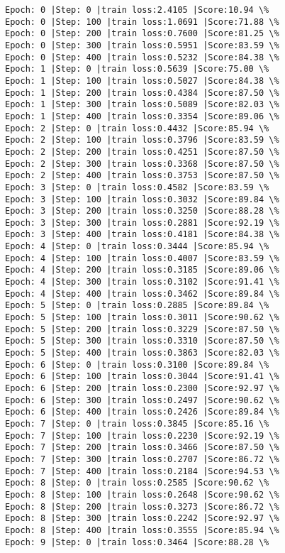 \documentclass[11pt]{article}
\begin{document}
    \begin{Verbatim}[commandchars=\\\{\}]
Epoch: 0 |Step: 0 |train loss:2.4105 |Score:10.94 \%
Epoch: 0 |Step: 100 |train loss:1.0691 |Score:71.88 \%
Epoch: 0 |Step: 200 |train loss:0.7600 |Score:81.25 \%
Epoch: 0 |Step: 300 |train loss:0.5951 |Score:83.59 \%
Epoch: 0 |Step: 400 |train loss:0.5232 |Score:84.38 \%
Epoch: 1 |Step: 0 |train loss:0.5639 |Score:75.00 \%
Epoch: 1 |Step: 100 |train loss:0.5027 |Score:84.38 \%
Epoch: 1 |Step: 200 |train loss:0.4384 |Score:87.50 \%
Epoch: 1 |Step: 300 |train loss:0.5089 |Score:82.03 \%
Epoch: 1 |Step: 400 |train loss:0.3354 |Score:89.06 \%
Epoch: 2 |Step: 0 |train loss:0.4432 |Score:85.94 \%
Epoch: 2 |Step: 100 |train loss:0.3796 |Score:83.59 \%
Epoch: 2 |Step: 200 |train loss:0.4251 |Score:87.50 \%
Epoch: 2 |Step: 300 |train loss:0.3368 |Score:87.50 \%
Epoch: 2 |Step: 400 |train loss:0.3753 |Score:87.50 \%
Epoch: 3 |Step: 0 |train loss:0.4582 |Score:83.59 \%
Epoch: 3 |Step: 100 |train loss:0.3032 |Score:89.84 \%
Epoch: 3 |Step: 200 |train loss:0.3250 |Score:88.28 \%
Epoch: 3 |Step: 300 |train loss:0.2881 |Score:92.19 \%
Epoch: 3 |Step: 400 |train loss:0.4181 |Score:84.38 \%
Epoch: 4 |Step: 0 |train loss:0.3444 |Score:85.94 \%
Epoch: 4 |Step: 100 |train loss:0.4007 |Score:83.59 \%
Epoch: 4 |Step: 200 |train loss:0.3185 |Score:89.06 \%
Epoch: 4 |Step: 300 |train loss:0.3102 |Score:91.41 \%
Epoch: 4 |Step: 400 |train loss:0.3462 |Score:89.84 \%
Epoch: 5 |Step: 0 |train loss:0.2885 |Score:89.84 \%
Epoch: 5 |Step: 100 |train loss:0.3011 |Score:90.62 \%
Epoch: 5 |Step: 200 |train loss:0.3229 |Score:87.50 \%
Epoch: 5 |Step: 300 |train loss:0.3310 |Score:87.50 \%
Epoch: 5 |Step: 400 |train loss:0.3863 |Score:82.03 \%
Epoch: 6 |Step: 0 |train loss:0.3100 |Score:89.84 \%
Epoch: 6 |Step: 100 |train loss:0.3044 |Score:91.41 \%
Epoch: 6 |Step: 200 |train loss:0.2300 |Score:92.97 \%
Epoch: 6 |Step: 300 |train loss:0.2497 |Score:90.62 \%
Epoch: 6 |Step: 400 |train loss:0.2426 |Score:89.84 \%
Epoch: 7 |Step: 0 |train loss:0.3845 |Score:85.16 \%
Epoch: 7 |Step: 100 |train loss:0.2230 |Score:92.19 \%
Epoch: 7 |Step: 200 |train loss:0.3466 |Score:87.50 \%
Epoch: 7 |Step: 300 |train loss:0.2707 |Score:86.72 \%
Epoch: 7 |Step: 400 |train loss:0.2184 |Score:94.53 \%
Epoch: 8 |Step: 0 |train loss:0.2585 |Score:90.62 \%
Epoch: 8 |Step: 100 |train loss:0.2648 |Score:90.62 \%
Epoch: 8 |Step: 200 |train loss:0.3273 |Score:86.72 \%
Epoch: 8 |Step: 300 |train loss:0.2242 |Score:92.97 \%
Epoch: 8 |Step: 400 |train loss:0.3555 |Score:85.94 \%
Epoch: 9 |Step: 0 |train loss:0.3464 |Score:88.28 \%

\end{Verbatim}
\end{document}
